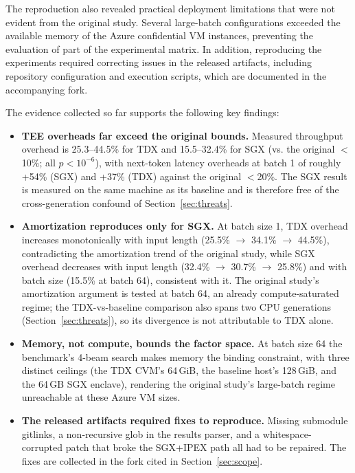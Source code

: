 \documentclass[sigconf]{acmart}
\begin{document}
The reproduction also revealed practical deployment limitations that were not evident
from the original study. Several large-batch configurations exceeded the available
memory of the Azure confidential VM instances, preventing the evaluation of part of the
experimental matrix. In addition, reproducing the experiments required correcting
issues in the released artifacts, including repository configuration and execution
scripts, which are documented in the accompanying fork.

The evidence collected so far supports the following key findings:

\begin{itemize}
  \item \textbf{TEE overheads far exceed the original bounds.} Measured throughput
  overhead is 25.3--44.5\% for TDX and 15.5--32.4\% for SGX (vs. the original
  $<$10\%; all $p < 10^{-6}$), with next-token latency overheads at batch 1 of roughly
  +54\% (SGX) and +37\% (TDX) against the original $<$20\%. The SGX result is measured
  on the same machine as its baseline and is therefore free of the cross-generation
  confound of Section~\ref{sec:threats}.
  \item \textbf{Amortization reproduces only for SGX.} At batch size 1, TDX overhead
  increases monotonically with input length (25.5\% $\rightarrow$ 34.1\% $\rightarrow$
  44.5\%), contradicting the amortization trend of the original study, while SGX
  overhead decreases with input length (32.4\% $\rightarrow$ 30.7\% $\rightarrow$
  25.8\%) and with batch size (15.5\% at batch 64), consistent with it. The original
  study's amortization argument is tested at batch 64, an already compute-saturated
  regime; the TDX-vs-baseline comparison also spans two CPU generations
  (Section~\ref{sec:threats}), so its divergence is not attributable to TDX alone.
  \item \textbf{Memory, not compute, bounds the factor space.} At batch size 64 the
  benchmark's 4-beam search makes memory the binding constraint, with three distinct
  ceilings (the TDX CVM's 64\,GiB, the baseline host's 128\,GiB, and the 64\,GB SGX
  enclave), rendering the original study's large-batch regime unreachable at these
  Azure VM sizes.
  \item \textbf{The released artifacts required fixes to reproduce.} Missing submodule
  gitlinks, a non-recursive glob in the results parser, and a whitespace-corrupted
  patch that broke the SGX+IPEX path all had to be repaired. The fixes are collected in
  the fork cited in Section~\ref{sec:scope}.
\end{itemize}
\end{document}
